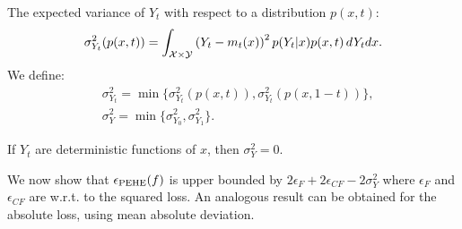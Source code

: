 \begin{thmappdef}\label{def:sigma2}
The expected variance of $Y_t$ with respect to a distribution $p(x,t)$:
$$\sigma^2_{Y_t}(p(x,t)) = \int_{\mathcal X \times \mathcal Y} \left(Y_t - m_t(x)\right)^2 p(Y_t|x)p(x,t) \, dY_t dx .$$
We define:
\begin{align*}
&\sigma^2_{Y_t} = \min\{\sigma^2_{Y_t}(p(x,t)), \sigma^2_{Y_t}(p(x,1-t))\} , \\
&\sigma^2_{Y} = \min\{\sigma^2_{Y_0},\sigma^2_{Y_1}\}.
\end{align*}
\end{thmappdef}
If $Y_t$ are deterministic functions of $x$, then $\sigma^2_{Y} = 0$.


We now show that $\epsilon_{\text{PEHE}}(f)$ is upper bounded by $2 \epsilon_F + 2 \epsilon_{CF} - 2\sigma^2_Y$ where $\epsilon_F$ and $\epsilon_{CF}$ are w.r.t. to the squared loss. An analogous result can be obtained for the absolute loss, using mean absolute deviation. 

